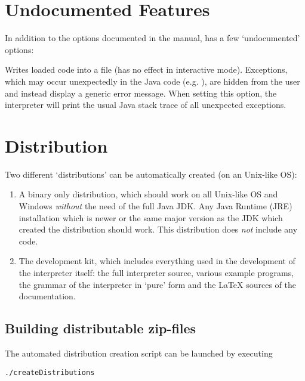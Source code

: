 \section{Undocumented Features}

In addition to the options documented in the manual, \setlX{} has a few `undocumented' options:

\begin{itemize}
	      {Writes loaded code into a file (has no effect in interactive mode).}
	      {Exceptions, which may occur unexpectedly in the Java code (e.g. ), are hidden from the user and instead display a generic error message.
		When setting this option, the interpreter will print the usual Java stack trace of all unexpected exceptions.}
\end{itemize}

\section{Distribution}

Two different `distributions' can be automatically created (on an Unix-like OS):

\begin{enumerate}
	\item A binary only distribution, which should work on all Unix-like OS and Windows \emph{without} the need of the full Java JDK.
		Any Java Runtime (JRE) installation which is newer or the same major version as the JDK which created the distribution should work.
		This distribution does \emph{not} include any \SetlX{} code.

	\item The development kit, which includes everything used in the development of the interpreter itself: the full interpreter source, various \SetlX{} example programs, the grammar of the interpreter in `pure' form and the \LaTeX{} sources of the documentation.
\end{enumerate}

\subsection{Building distributable zip-files}

The automated distribution creation script can be launched by executing

\begin{lstlisting}[frame=none,numbers=none]
./createDistributions
\end{lstlisting}

